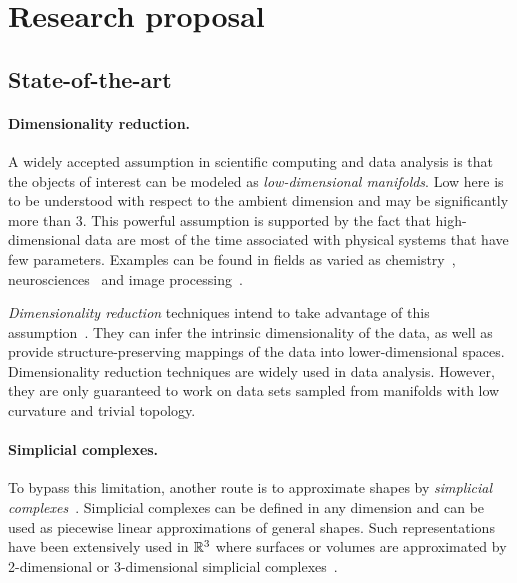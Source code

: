 \section{Research proposal}

\subsection{State-of-the-art}

\paragraph{Dimensionality reduction.} A widely accepted assumption in scientific computing and data analysis is that the objects of interest can be modeled as {\em low-dimensional manifolds}. Low here is to be understood with respect to the ambient dimension and may be significantly more than 3. This powerful assumption is supported by the fact that high-dimensional data are most of the time associated with physical systems that have few parameters.  Examples can be found in fields as varied as chemistry~\cite{mtcw-tco-2010}, neurosciences~\cite{} and  image processing~\cite{cids-lbsni-2008}.

 {\em Dimensionality reduction} techniques intend to take advantage of this assumption~\cite{lv-nldr-2007}.
They can infer the intrinsic dimensionality of the data, as well as provide structure-preserving mappings of the data  into lower-dimensional spaces. Dimensionality reduction techniques are widely used in data analysis. However, they are only guaranteed to work  on data sets sampled from manifolds with low curvature and trivial topology.

\paragraph{Simplicial complexes.} To bypass this limitation, another route is to approximate shapes by {\em simplicial complexes}~\cite{hh-ct-2010}. Simplicial complexes can be defined in any dimension and can be used as piecewise linear approximations of general shapes.
Such representations have been extensively used in $\mathbb R ^3$ where surfaces or volumes are approximated by 2-dimensional or 3-dimensional simplicial complexes~\cite{geometrica-ecg-book}. 


